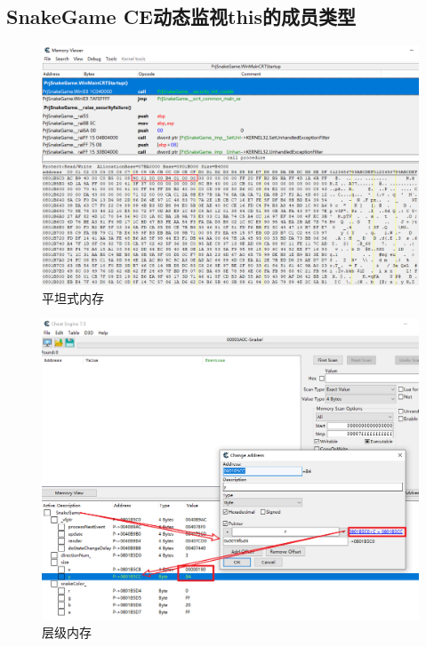 \documentclass[AutoFakeBold,AutoFakeSlant]{beamer}
\begin{document}
\subsection{SnakeGame CE动态监视this的成员类型}
\begin{frame}[fragile]
    \begin{figure}
        \centering %
        \includegraphics[width=\linewidth]{CE_MEM_FLAT.png}
        \caption{平坦式内存}
        \label{fig:CE_MEM_FLAT}
    \end{figure}
\end{frame}


\begin{frame}[fragile]
    \begin{figure}
        \centering %
        \includegraphics[width=0.85\linewidth]{CE_MEM_TREE.png}
        \caption{层级内存}
        \label{fig:CE_MEM_TREE}
    \end{figure}
\end{frame}
\end{document}
